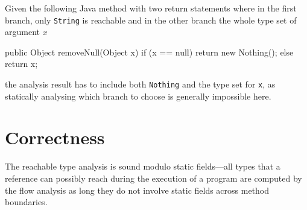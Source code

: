 \begin{example}
\label{ex:branch}
Given the following Java method with two return statements where in the first branch, only \texttt{String} is reachable and in the other branch the whole type set of argument $x$
\begin{javacode}
public Object removeNull(Object x) {
    if (x == null) {
        return new Nothing();
    } else {
        return x;
    }
}
\end{javacode}
the analysis result has to include both \texttt{Nothing} and the type set for \texttt{x}, as statically analysing which branch to choose is generally impossible here.
\end{example}

\section{Correctness}
\begin{theorem}
The reachable type analysis is sound modulo static fields---all types that a reference can possibly reach during the execution of a program are computed by the flow analysis as long they do not involve static fields across method boundaries.
\end{theorem}
